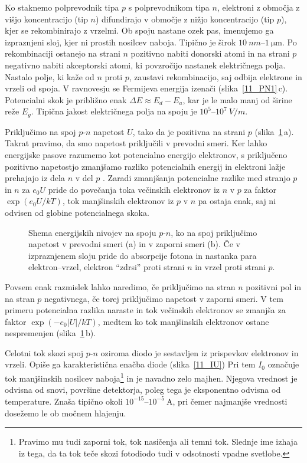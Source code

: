 Ko staknemo polprevodnik tipa $p$ s polprevodnikom tipa $n$, elektroni 
z območja z višjo koncentracijo (tip $n$) difundirajo v območje z nižjo koncentracijo
(tip $p$), kjer se rekombinirajo z vrzelmi. 
Ob spoju nastane ozek pas, imenujemo ga izpraznjeni sloj, kjer ni  
prostih nosilcev naboja. Tipično je širok $10~\si{nm}$--$1~\si{\micro\metre}$.
Po rekombinaciji ostanejo na strani $n$ pozitivno nabiti donorski atomi in 
na strani $p$ negativno nabiti akceptorski atomi, ki povzročijo nastanek  
električnega polja. Nastalo polje, ki kaže od $n$ proti $p$, zaustavi rekombinacijo, saj odbija
elektrone in vrzeli od spoja. V ravnovesju se Fermijeva energija izenači (slika~\ref{11_PN1}\,c). 
Potencialni skok je približno enak $\Delta E \approx E_d-E_a$, kar je le malo manj od 
širine reže $E_g$. Tipična jakost električnega polja na spoju je $10^5$--$10^7~\si{V/m}$.

Priključimo na spoj $p$-$n$ napetost $U$, tako da je pozitivna na strani $p$ (slika~\ref{11_PNU}\,a). 
Takrat pravimo, da smo napetost priključili v prevodni smeri.
Ker lahko energijske pasove razumemo kot potencialno energijo elektronov, 
s priključeno pozitivno napetostjo zmanjšamo razliko potencialnih energij 
in elektroni lažje prehajajo iz dela $n$ v del $p$ . 
Zaradi zmanjšanja potencialne razlike med stranjo $p$ in $n$ za $e_0U$ pride do povečanja toka 
večinskih elektronov iz $n$ v $p$ za faktor $\exp(e_0 U/kT)$, tok manjšinskih elektronov
iz $p$ v $n$ pa ostaja enak, saj ni odvisen od globine potencialnega skoka. 
\begin{figure}[h]
\centering
\def\svgwidth{140truemm} 

\caption{Shema energijskih nivojev na spoju $p$-$n$, ko na spoj priključimo napetost
v prevodni smeri (a) in v zaporni smeri (b). Če v izpraznjenem sloju pride do absorpcije
fotona in nastanka para elektron--vrzel, elektron ``zdrsi'' proti strani $n$ in vrzel proti
strani $p$.}
\label{11_PNU}
\end{figure}

Povsem enak razmislek lahko naredimo, če priključimo 
na stran $n$ pozitivni pol in na stran $p$ negativnega, če torej priključimo
napetost v zaporni smeri. V tem primeru potencialna razlika naraste in tok 
večinskih elektronov se zmanjša za faktor $\exp(-e_0 |U|/kT)$, medtem ko tok 
manjšinskih elektronov ostane nespremenjen (slika~\ref{11_PNU}\,b).

Celotni tok skozi spoj $p$-$n$ oziroma diodo je sestavljen iz prispevkov elektronov in vrzeli. Opiše ga
karakteristična enačba diode (slika~\ref{11_IU})
Pri tem $I_0$ označuje tok manjšinskih nosilcev naboja\footnote{Pravimo
mu tudi zaporni tok, tok nasičenja ali temni tok. Slednje ime izhaja iz tega, da
ta tok teče skozi fotodiodo tudi v odsotnosti vpadne svetlobe.}
in je navadno zelo majhen. Njegova vrednost je odvisna od snovi, površine
detektorja, poleg tega je eksponentno odvisna od temperature. Znaša 
tipično okoli $10^{-15}$--$10^{-5}~\si{\ampere}$, pri čemer najmanjše
vrednosti dosežemo le ob močnem hlajenju. 

